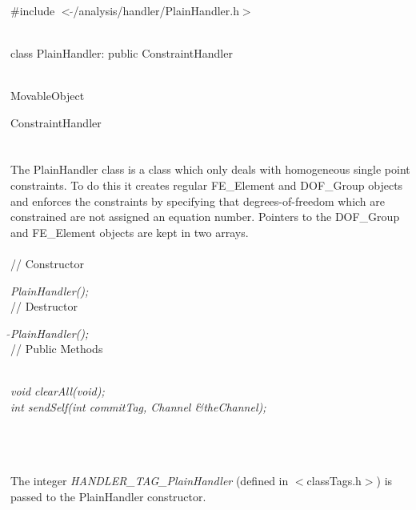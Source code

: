 
   \\
\#include $<\tilde{ }$/analysis/handler/PlainHandler.h$>$  


  \\
class PlainHandler: public ConstraintHandler  


 \\
MovableObject 

\indent\indent ConstraintHandler \\
\indent\indent{} \\

 \\ 
\indent The PlainHandler class is a class which only deals with
homogeneous single point constraints. To do this it creates regular
FE\_Element and DOF\_Group objects and enforces the constraints by
specifying that degrees-of-freedom which are constrained are not
assigned an equation number. Pointers to the DOF\_Group and
FE\_Element objects are kept in two arrays. \\

 \\
// Constructor 

{\em PlainHandler();}\\  

// Destructor 

{\em $\tilde{ }$PlainHandler();}\\  

// Public Methods

 \\ 
{\em void clearAll(void);} \\ 

{\em int sendSelf(int commitTag, Channel \&theChannel); } 

 \\

 \\
\\ 
The integer {\em HANDLER\_TAG\_PlainHandler} (defined in
$<$classTags.h$>$) is passed to the PlainHandler constructor. \\

